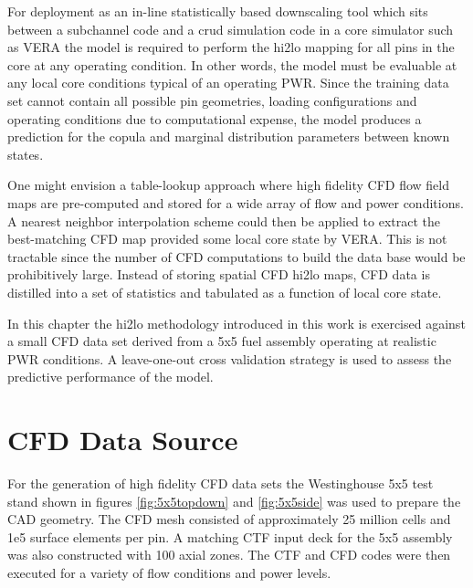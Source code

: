 \label{sec:ml_cfd}

For deployment as an in-line statistically based downscaling tool which sits between a subchannel code and a crud simulation code in a core simulator such as VERA the model is required to perform the hi2lo mapping for all pins in the core at any operating condition.  In other words, the model must be evaluable at any local core conditions typical of an operating PWR.  Since the training data set cannot contain all possible pin geometries, loading configurations and operating conditions due to computational expense, the model produces a prediction for the copula and marginal distribution parameters between known states.

One might envision a table-lookup approach where high fidelity CFD flow field maps are pre-computed and stored for a wide array of flow and power conditions.  A nearest neighbor interpolation scheme could then be applied to extract the best-matching CFD map provided some local core state by VERA.  This is not tractable since the number of CFD computations to build the data base would be prohibitively large.  Instead of storing spatial CFD hi2lo maps, CFD data is distilled into a set of statistics and tabulated as a function of local core state.


In this chapter the hi2lo methodology introduced in this work is exercised against a small CFD data set derived from a 5x5 fuel assembly operating at realistic PWR conditions.  A leave-one-out cross validation strategy is used to assess the predictive performance of the model.


\section{CFD Data Source}
\label{sec:cfd_data_source}

For the generation of high fidelity CFD data sets the Westinghouse 5x5 test stand shown in figures \ref{fig:5x5topdown} and \ref{fig:5x5side} was used to prepare the CAD geometry.  The CFD mesh consisted of approximately 25 million cells and 1e5 surface elements per pin.  A matching CTF input deck for the 5x5 assembly was also constructed with 100 axial zones.  The CTF and CFD codes were then executed for a variety of flow conditions and power levels.

